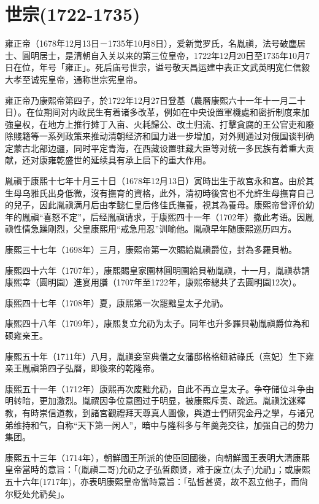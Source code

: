 
\section{世宗\tiny(1722-1735)}

雍正帝（1678年12月13日－1735年10月8日），爱新觉罗氏，名胤禛，法号破塵居士、圓明居士，是清朝自入关以来的第三位皇帝，1722年12月20日至1735年10月7日在位，年号「雍正」。死后庙号世宗，谥号敬天昌运建中表正文武英明宽仁信毅大孝至诚宪皇帝，通称世宗宪皇帝。

雍正帝乃康熙帝第四子，於1722年12月27日登基（農曆康熙六十一年十一月二十日）。在位期间对内政民生有着诸多改革，例如在中央设置軍機處和密折制度来加強皇权，在地方上推行摊丁入亩、火耗歸公、改土归流、打擊貪腐的王公官吏和廢除賤籍等一系列政策来推动清朝经济和国力进一步增加，对外则通过对俄国谈判确定蒙古北部边疆，同时平定青海，在西藏设置驻藏大臣等对统一多民族有着重大贡献，还对康雍乾盛世的延续具有承上启下的重大作用。

胤禛于康熙十七年十月三十日（1678年12月13日）寅時出生于故宫永和宫。由於其生母乌雅氏出身低微，沒有撫育的資格，此外，清初時後宮也不允許生母撫育自己的兒子，因此胤禛满月后由孝懿仁皇后佟佳氏撫養，視其為養母。康熙帝曾评价幼年的胤禛“喜怒不定”，后经胤禛请求，于康熙四十一年（1702年）撤此考语。因胤禛性情急躁剛烈，父皇康熙用“戒急用忍”训喻他。胤禛早年随康熙巡历四方。

康熙三十七年（1698年）三月，康熙帝第一次賜給胤禛爵位，封為多羅貝勒。

康熙四十六年（1707年），康熙賜皇家園林圓明園給貝勒胤禛，十一月，胤禛恭請康熙幸（圓明園）進宴用膳（1707年至1722年，康熙帝總共了去圓明園12次）。

康熙四十七年（1708年）夏，康熙第一次罷黜皇太子允礽。

康熙四十八年（1709年），康熙复立允礽为太子。同年也升多羅貝勒胤禛爵位為和硕雍亲王。

康熙五十年（1711年）八月，胤禛妾室典儀之女藩邸格格鈕祜祿氏（熹妃）生下雍亲王胤禛第四子弘曆，即後來的乾隆帝。

康熙五十一年（1712年）康熙再次废黜允礽，自此不再立皇太子。争夺储位斗争由明转暗，更加激烈。胤禩因争位意图过于明显，被康熙斥责、疏远。胤禛沈迷釋教，有時崇信道教，到諸宮觀禮拜天尊真人圖像，與道士們研究金丹之學，与诸兄弟维持和气，自称“天下第一闲人”，暗中与隆科多与年羹尧交往，加强自己的势力集团。

康熙五十三年（1714年），朝鮮國王所派的使臣回國後，向朝鮮國王表明大清康熙皇帝當時的意旨：「(胤禛二哥)允礽之子弘皙颇贤，难于废立(太子)允礽」；或康熙五十六年(1717年)，亦表明康熙皇帝當時意旨：「弘皙甚贤，故不忍立他子，而尙尔贬处允礽矣」。

